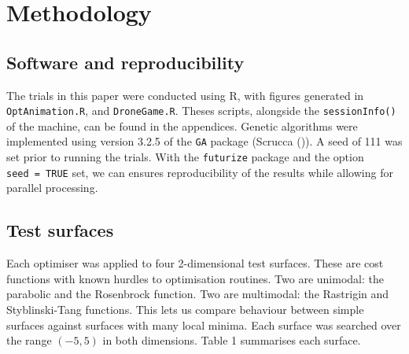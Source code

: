 \documentclass[
  a4paper,
  DIV=11,
  numbers=noendperiod]{scrartcl}
\newcommand{\+}{\phantom{-}}
\begin{document}
\newpage

\section{Methodology}\label{methodology}

\subsection{Software and
reproducibility}\label{software-and-reproducibility}

The trials in this paper were conducted using R, with figures generated
in \texttt{OptAnimation.R}, and \texttt{DroneGame.R}. Theses scripts,
alongside the \texttt{sessionInfo()} of the machine, can be found in the
appendices. Genetic algorithms were implemented using version 3.2.5 of
the \texttt{GA} package (Scrucca ()). A
seed of 111 was set prior to running the trials. With the
\texttt{futurize} package and the option \texttt{seed\ =\ TRUE} set, we
can ensures reproducibility of the results while allowing for parallel
processing.

\subsection{Test surfaces}\label{test-surfaces}

Each optimiser was applied to four 2-dimensional test surfaces. These
are cost functions with known hurdles to optimisation routines. Two are
unimodal: the parabolic and the Rosenbrock function. Two are multimodal:
the Rastrigin and Styblinski-Tang functions. This lets us compare
behaviour between simple surfaces against surfaces with many local
minima. Each surface was searched over the range \(\left(-5,5\right)\)
in both dimensions. Table 1 summarises each surface.
\end{document}
